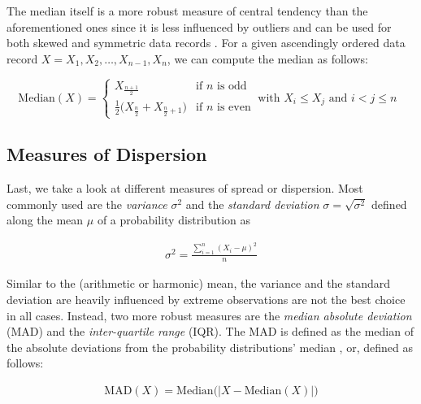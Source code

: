 The median itself is a more robust measure of central tendency than the
aforementioned ones since it is less influenced by outliers and can be used for
both skewed and symmetric data records \citep{shanmugam_statistics_2015}. For a
given ascendingly ordered data record $X = X_1, X_2, \ldots, X_{n-1}, X_n$, we
can compute the median as follows:

\begin{equation} \label{eq:median}
\mathrm{Median}(X) = \begin{cases}
     X_{\frac{n+1}{2}} & \text{if $n$ is odd} \\
     \frac{1}{2}\big(X_{\frac{n}{2}} + X_{\frac{n}{2}+1}\big) & \text{if $n$ is
     even}
   \end{cases}~\text{with $X_i \leq X_j$ and $i < j \leq n$ }
\end{equation}

\subsection{Measures of Dispersion}

Last, we take a look at different measures of spread or dispersion. Most
commonly used are the \emph{variance} $\sigma^2$ and the \emph{standard
deviation} $\sigma = \sqrt{\sigma^2}$ defined along the mean $\mu$ of a
probability distribution as

\begin{equation} \label{eq:variance}
\begin{split}
\sigma^2 = \frac{\sum_{i=1}^{n}(X_i - \mu)^2}{n}
\end{split}
\end{equation}

Similar to the (arithmetic or harmonic) mean, the variance and the standard
deviation are heavily influenced by extreme observations
\citep{shanmugam_statistics_2015} are not the best choice in all cases. Instead,
two more robust measures are the \emph{median absolute deviation} (MAD) and the \emph{inter-quartile range} (IQR). The MAD is defined as the median of the absolute deviations from the probability distributions'
median \citep{molyneaux_art_2014}, or, defined as follows:

\begin{equation} \label{eq:mad}
\begin{split}
\mathrm{MAD}(X) = \mathrm{Median}\big(|X - \mathrm{Median}(X)|\big)
\end{split}
\end{equation}
 
